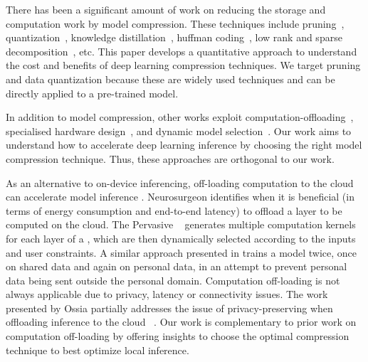 There has been a significant amount of work on reducing the storage and computation work by model compression. These techniques include
pruning~\cite{}, quantization~\cite{}, knowledge distillation~\cite{}, huffman coding~\cite{}, low rank and sparse decomposition~\cite{},
etc. This paper develops a quantitative approach to understand the cost and benefits of deep learning compression techniques. We target
pruning and data quantization because these are widely used techniques and can be directly applied to a pre-trained model.



In addition to model compression, other works exploit computation-offloading~\cite{teerapittayanon2017distributed,Kang2017neurosurgeon},
specialised hardware design~\cite{chen2017eyeriss,Han:2016:EEI:3001136.3001163}, and dynamic model
selection~\cite{Taylor:2018:ADL:3211332.3211336}. Our work aims to understand how to accelerate deep learning inference by choosing the
right model compression technique. Thus, these approaches are orthogonal to our work.


As an alternative to on-device inferencing, off-loading computation to the cloud can accelerate \DNN model inference
\cite{teerapittayanon2017distributed}. Neurosurgeon \cite{Kang2017neurosurgeon} identifies when it is beneficial (\eg in terms of energy
consumption and end-to-end latency) to offload a \DNN layer to be computed on the cloud. The Pervasive \CNN~\cite{song2017towards} generates
multiple computation kernels for each layer of a \CNN, which are then dynamically selected according to the inputs and user constraints. A
similar approach presented in \cite{servia2017personal} trains a model twice, once on shared data and again on personal data, in an attempt to
prevent personal data being sent outside the personal domain. Computation off-loading is not always applicable due to privacy, latency or
connectivity issues. The work presented by Ossia \etal partially addresses the issue of privacy-preserving when offloading \DNN inference
to the cloud ~\cite{osia2017hybrid}. Our work is complementary to prior work on computation off-loading by offering insights to choose the
optimal compression technique to best optimize local inference.




